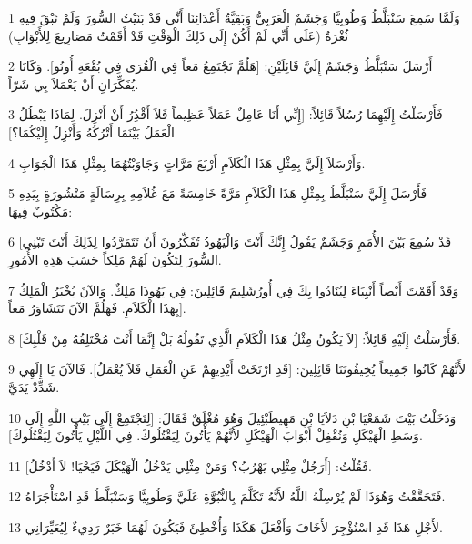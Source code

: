 \par 1 وَلَمَّا سَمِعَ سَنْبَلَّطُ وَطُوبِيَّا وَجَشَمٌ الْعَرَبِيُّ وَبَقِيَّةُ أَعْدَائِنَا أَنِّي قَدْ بَنَيْتُ السُّورَ وَلَمْ تَبْقَ فِيهِ ثُغْرَةٌ (عَلَى أَنِّي لَمْ أَكُنْ إِلَى ذَلِكَ الْوَقْتِ قَدْ أَقَمْتُ مَصَارِيعَ لِلأَبْوَابِ)
\par 2 أَرْسَلَ سَنْبَلَّطُ وَجَشَمٌ إِلَيَّ قَائِلَيْنِ: [هَلُمَّ نَجْتَمِعُ مَعاً فِي الْقُرَى فِي بُقْعَةِ أُونُو]. وَكَانَا يُفَكِّرَانِ أَنْ يَعْمَلاَ بِي شَرّاً.
\par 3 فَأَرْسَلْتُ إِلَيْهِمَا رُسُلاً قَائِلاً: [إِنِّي أَنَا عَامِلٌ عَمَلاً عَظِيماً فَلاَ أَقْدُِرُ أَنْ أَنْزِلَ. لِمَاذَا يَبْطُلُ الْعَمَلُ بَيْنَمَا أَتْرُكُهُ وَأَنْزِلُ إِلَيْكُمَا؟]
\par 4 وَأَرْسَلاَ إِلَيَّ بِمِثْلِ هَذَا الْكَلاَمِ أَرْبَعَ مَرَّاتٍ وَجَاوَبْتُهُمَا بِمِثْلِ هَذَا الْجَوَابِ.
\par 5 فَأَرْسَلَ إِلَيَّ سَنْبَلَّطُ بِمِثْلِ هَذَا الْكَلاَمِ مَرَّةً خَامِسَةً مَعَ غُلاَمِهِ بِرِسَالَةٍ مَنْشُورَةٍ بِيَدِهِ مَكْتُوبٌ فِيهَا:
\par 6 [قَدْ سُمِعَ بَيْنَ الأُمَمِ وَجَشَمٌ يَقُولُ إِنَّكَ أَنْتَ وَالْيَهُودُ تُفَكِّرُونَ أَنْ تَتَمَرَّدُوا لِذَلِكَ أَنْتَ تَبْنِي السُّورَ لِتَكُونَ لَهُمْ مَلِكاً حَسَبَ هَذِهِ الأُمُورِ.
\par 7 وَقَدْ أَقَمْتَ أَيْضاً أَنْبِيَاءَ لِيُنَادُوا بِكَ فِي أُورُشَلِيمَ قَائِلِينَ: فِي يَهُوذَا مَلِكٌ. وَالآنَ يُخْبَرُ الْمَلِكُ بِهَذَا الْكَلاَمِ. فَهَلُمَّ الآنَ نَتَشَاوَرُ مَعاً].
\par 8 فَأَرْسَلْتُ إِلَيْهِ قَائِلاً: [لاَ يَكُونُ مِثْلُ هَذَا الْكَلاَمِ الَّذِي تَقُولُهُ بَلْ إِنَّمَا أَنْتَ مُخْتَلِقُهُ مِنْ قَلْبِكَ].
\par 9 لأَنَّهُمْ كَانُوا جَمِيعاً يُخِيفُونَنَا قَائِلِينَ: [قَدِ ارْتَخَتْ أَيْدِيهِمْ عَنِ الْعَمَلِ فَلاَ يُعْمَلُ]. فَالآنَ يَا إِلَهِي شَدِّدْ يَدَيَّ.
\par 10 وَدَخَلْتُ بَيْتَ شَمَعْيَا بْنِ دَلاَيَا بْنِ مَهِيطَبْئِيلَ وَهُوَ مُغْلَقٌ فَقَالَ: [لِنَجْتَمِعْ إِلَى بَيْتِ اللَّهِ إِلَى وَسَطِ الْهَيْكَلِ وَنُقْفِلْ أَبْوَابَ الْهَيْكَلِ لأَنَّهُمْ يَأْتُونَ لِيَقْتُلُوكَ. فِي اللَّيْلِ يَأْتُونَ لِيَقْتُلُوكَ].
\par 11 فَقُلْتُ: [أَرَجُلٌ مِثْلِي يَهْرُبُ؟ وَمَنْ مِثْلِي يَدْخُلُ الْهَيْكَلَ فَيَحْيَا! لاَ أَدْخُلُ].
\par 12 فَتَحَقَّقْتُ وَهُوَذَا لَمْ يُرْسِلْهُ اللَّهُ لأَنَّهُ تَكَلَّمَ بِالنُّبُوَّةِ عَلَيَّ وَطُوبِيَّا وَسَنْبَلَّطُ قَدِ اسْتَأْجَرَاهُ.
\par 13 لأَجْلِ هَذَا قَدِ اسْتُؤْجِرَ لأَخَافَ وَأَفْعَلَ هَكَذَا وَأُخْطِئَ فَيَكُونَ لَهُمَا خَبَرٌ رَدِيءٌ لِيُعَيِّرَانِي.
